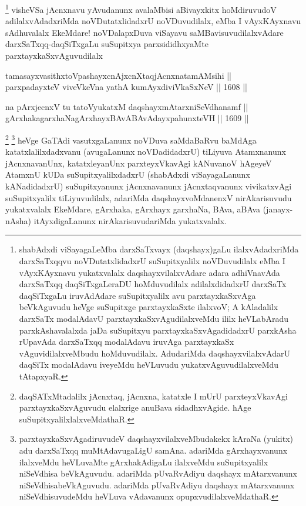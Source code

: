 \begin{artha}
\footnote{shabAdxdi viSayagaLeMba darxSaTxvayx (daqshayx)gaLu ilalxvAdadxriMda darxSaTxqqvu noVDutatxlidadxrU suSupitxyalilx noVDuvudilalx eMba I vAyxKAyxnavu yukatxvalalx daqshayxvilalxvAdare adara adhiVnavAda darxSaTxqq daqSiTxgaLeraDU hoMduvudilalx adilalxdidadxrU darxSaTx daqSiTxgaLu iruvAdAdare suSupitxyalilx avu parxtayxkaSxvAga beVkAguvudu heVge suSupitxge parxtayxkaSxte ilalxvoV; A kAladalilx darxSaTx modalAdavU parxtayxkaSxvAgudilalxveMdu ililx heVLabAradu parxkAshavalalxda jaDa suSupitxyu parxtayxkaSxvAgadidadxrU parxkAsha rUpavAda darxSaTxqq modalAdavu iruvAga parxtayxkaSx vAguvidilalxveMbudu hoMduvudilalx. AdudariMda daqshayxvilalxvAdarU daqSiTx modalAdavu iveyeMdu heVLuvudu yukatxvAguvudilalxveMdu tAtapxyaR.}
visheVSa jAcnxnavu yAvudanunx avalaMbisi aBivayxkitx hoMdiruvudoV adilalxvAdadxriMda noVDutatxlidadxrU noVDuvudilalx, eMba I vAyxKAyxnavu sAdhuvalalx EkeMdare! noVDalapxDuva viSayavu saMBavisuvudilalxvAdare darxSaTxqq-daqSiTxgaLu suSupitxya parxsididhxyaMte parxtayxkaSxvAguvudilalx
\end{artha}


\begin{shl}
tamasayxvasithxtoV\s pashayxcnAjxcnXtaqjAcnxnatamAMsihi || \\
parxpadayxteV viveVkeVna yathA kumAyxdiviVkaSxNeV ||  1608 ||  
\end{shl}

\begin{shl}
na pArxjecnxV tu tatoV\s yukatxM daqshayxmAtarxniSeVdhanamf || \\
gArxhakagarxhaNagArxhayxBAvABAvAdayxpahunxteVH ||  1609 ||  
\end{shl}

\begin{artha}
\footnote{daqSATxMtadalilx jAcnxtaq, jAcnxna, katatxle I mUrU parxteyxVkavAgi parxtayxkaSxvAguvudu elalxrige anuBava sidadhxvAgide. hAge suSupitxyalilxlalxveMdathaR.}
\footnote{parxtayxkaSxvAgadiruvudeV daqshayxvilalxveMbudakekx kAraNa (yukitx) adu darxSaTxqq muMtAdavugaLigU samAna. adariMda gArxhayxvanunx ilalxveMdu heVLuvaMte gArxhakAdigaLu ilalxveMdu suSupitxyalilx niSeVdhisa beVkAguvudu. adariMda pUvaRvAdiyu daqshayx mAtarxvanunx niSeVdhisabeVkAguvudu. adariMda pUvaRvAdiyu daqshayx mAtarxvanunx niSeVdhisuvudeMdu heVLuva vAdavanunx opupxvudilalxveMdathaR.}
heVge GaTAdi vasutxgaLanunx noVDuva saMdaBaRvu baMdAga katatxlalilxdadxvanu (avugaLanunx noVDadidadxrU) tiLiyuva Atamxnanunx jAcnxnavanUnx, katatxleyanUnx parxteyxVkavAgi kANuvanoV hAgeyeV AtamxnU kUDa suSupitxyalilxdadxrU (shabAdxdi viSayagaLanunx kANadidadxrU) suSupitxyanunx jAcnxnavanunx jAcnxtaqvanunx vivikatxvAgi suSupitxyalilx tiLiyuvudilalx, adariMda daqshayxvoMdanenxV nirAkarisuvudu yukatxvalalx EkeMdare, gArxhaka, gArxhayx garxhaNa, BAva, aBAva (janayx-nAsha) itAyxdigaLanunx nirAkarisuvudariMda yukatxvalalx.
\end{artha}

